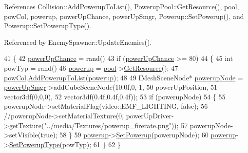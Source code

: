 References Collision\-::\-Add\-Powerup\-To\-List(), Powerup\-Pool\-::\-Get\-Resource(), pool, pow\-Col, powerup, power\-Up\-Chance, power\-Up\-Smgr, Powerup\-::\-Set\-Powerup(), and Powerup\-::\-Set\-Powerup\-Type().



Referenced by Enemy\-Spawner\-::\-Update\-Enemies().


\begin{DoxyCode}
41 \{
42     \hyperlink{_power_up_spawner_8cpp_aff9d41f803525ecf420cd66107f0787f}{powerUpChance} = rand() %
43     \textcolor{keywordflow}{if} (\hyperlink{_power_up_spawner_8cpp_aff9d41f803525ecf420cd66107f0787f}{powerUpChance} >= 80)
44     \{
45         \textcolor{keywordtype}{int} powTyp = rand() %
46         \hyperlink{_power_up_spawner_8cpp_ae69e278d6b99e84c0db1ecaf769b3f39}{powerup} = \hyperlink{_power_up_spawner_8cpp_ae53f1bf6f4bae393a5b32b2dbb2f0705}{pool}->\hyperlink{class_powerup_pool_a4b223578b11932dc8e82edc48d06d65f}{GetResource}();
47         \hyperlink{_power_up_spawner_8cpp_a8e8ac5767573483d8e9e3dfc198a8df8}{powCol}.\hyperlink{class_collision_affd296ad667fec8f353265488e4de292}{AddPowerupToList}(\hyperlink{_power_up_spawner_8cpp_ae69e278d6b99e84c0db1ecaf769b3f39}{powerup});
48 
49         IMeshSceneNode* \hyperlink{class_power_up_spawner_a0bf84727961b4a9239408026f8b392e6}{powerupNode} = \hyperlink{_power_up_spawner_8cpp_a21e35e3a83aa777a110cbdbab41c2a5f}{powerUpSmgr}->addCubeSceneNode(10.0f,0,-1, 
50             powerUpPosition,
51             vector3df(0,0,0),
52             vector3df(0.4f,0.4f,0.4f));
53         \textcolor{keywordflow}{if} (powerupNode)
54         \{
55             powerupNode->setMaterialFlag(video::EMF\_LIGHTING, \textcolor{keyword}{false});
56             \textcolor{comment}{//powerupNode->setMaterialTexture(0,
       powerUpDriver->getTexture("../media/Textures/powerup\_firerate.png"));}
57             powerupNode->setVisible(\textcolor{keyword}{true});
58         \}
59         \hyperlink{_power_up_spawner_8cpp_ae69e278d6b99e84c0db1ecaf769b3f39}{powerup}->\hyperlink{class_powerup_a83662c82e6c9c2192713f37e93da7867}{SetPowerup}(powerupNode);
60         \hyperlink{_power_up_spawner_8cpp_ae69e278d6b99e84c0db1ecaf769b3f39}{powerup}->\hyperlink{class_powerup_ad37083facb3025fa933d851ea8ecd549}{SetPowerupType}(powTyp);
61     \}
62 \}
\end{DoxyCode}


